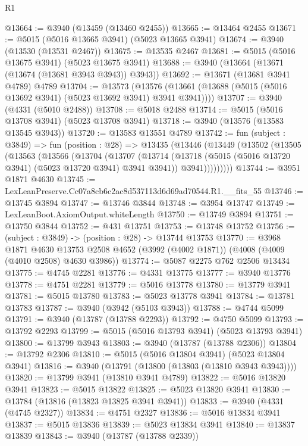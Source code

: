 \begin{lexlean}{R1}
\begin{coremodule}
@13664 := @3940 (@13459 (@13460 @2455))
@13665 := @13464 @2455
@13671 := @5015 (@5016 @13665 @3941) (@5023 @13665 @3941)
@13674 := @3940 (@13530 (@13531 @2467))
@13675 := @13535 @2467
@13681 := @5015 (@5016 @13675 @3941) (@5023 @13675 @3941)
@13688 := @3940 (@13664 (@13671 (@13674 (@13681 @3943 @3943)) @3943))
@13692 := @13671 (@13681 @3941 @4789) @4789
@13704 := @13573
    (@13576 (@13661 (@13688 (@5015 (@5016 @13692 @3941) (@5023 @13692 @3941) @3941 @3941))))
@13707 := @3940 (@4331 (@5010 @2488))
@13708 := @5018 @2488
@13714 := @5015 (@5016 @13708 @3941) (@5023 @13708 @3941)
@13718 := @3940 (@13576 (@13583 @13545 @3943))
@13720 := @13583 @13551 @4789
@13742 := fun (subject : @3849) =>
  fun (position : @28) =>
  @13435
    (@13446
      (@13449
        (@13502
          (@13505
            (@13563
              (@13566
                (@13704
                  (@13707
                    (@13714
                      (@13718 (@5015 (@5016 @13720 @3941) (@5023 @13720 @3941) @3941 @3941))
                      @3941)))))))))
@13744 := @3951 @1871 @4630
@13745 := LexLeanPreserve.Cc07a8cb6c2ac8d537113d6d69ad70544.R1.__fits_55
@13746 := @13745 @3894
@13747 := @13746 @3844
@13748 := @3954 @13747
@13749 := LexLeanBoot.AxiomOutput.whiteLength
@13750 := @13749 @3894
@13751 := @13750 @3844
@13752 := @431 @13751
@13753 := @13748 @13752
@13756 := (subject : @3849) -> (position : @28) -> @13744 @13753
@13770 := @3968
    @1871
    @4630
    @13753
    @2508
    @4652
    (@3992 (@4002 @1871))
    (@4008 (@4009 (@4010 @2508) @4630 @3986))
@13774 := @5087 @2275 @762 @2506 @13434
@13775 := @4745 @2281
@13776 := @4331 @13775
@13777 := @3940 @13776
@13778 := @4751 @2281
@13779 := @5016 @13778
@13780 := @13779 @3941
@13781 := @5015 @13780
@13783 := @5023 @13778 @3941
@13784 := @13781 @13783
@13787 := @3940 (@3942 (@5103 @3943))
@13788 := @4744 @5099
@13791 := @3940 (@13787 (@13788 @2293))
@13792 := @4750 @5099
@13793 := @13792 @2293
@13799 := @5015 (@5016 @13793 @3941) (@5023 @13793 @3941)
@13800 := @13799 @3943
@13803 := @3940 (@13787 (@13788 @2306))
@13804 := @13792 @2306
@13810 := @5015 (@5016 @13804 @3941) (@5023 @13804 @3941)
@13816 := @3940 (@13791 (@13800 (@13803 (@13810 @3943 @3943))))
@13820 := @13799 @3941 (@13810 @3941 @4789)
@13822 := @5016 @13820 @3941
@13823 := @5015 @13822
@13825 := @5023 @13820 @3941
@13830 := @13784 (@13816 (@13823 @13825 @3941 @3941))
@13833 := @3940 (@4331 (@4745 @2327))
@13834 := @4751 @2327
@13836 := @5016 @13834 @3941
@13837 := @5015 @13836
@13839 := @5023 @13834 @3941
@13840 := @13837 @13839
@13843 := @3940 (@13787 (@13788 @2339))

\end{coremodule}
\end{lexlean}
